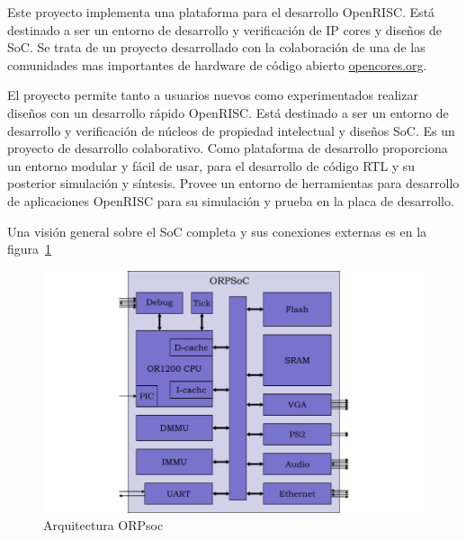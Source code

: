 				Este proyecto implementa una plataforma para el desarrollo OpenRISC. Está destinado a ser un entorno de desarrollo y verificación de IP cores y
				diseños de SoC. Se trata de un proyecto desarrollado con la colaboración de una de las comunidades mas importantes de hardware de código abierto
				\url{opencores.org}.


El proyecto permite tanto a usuarios nuevos como experimentados realizar diseños con un desarrollo rápido OpenRISC. Está destinado a ser un entorno de desarrollo y verificación de núcleos de propiedad intelectual y diseños SoC. Es un proyecto de desarrollo colaborativo. Como plataforma de desarrollo proporciona un entorno modular y fácil de usar, para el desarrollo de código RTL y su posterior simulación y síntesis. Provee un entorno de herramientas para desarrollo de aplicaciones OpenRISC para su simulación y prueba en la placa de desarrollo.

Una visión general sobre el SoC completa y sus conexiones externas es en la  figura~\ref{fig:esquemaorpsoc}

\begin{figure}[h!]
 \begin{center}
  \includegraphics[width=1\textwidth,keepaspectratio=true]{./images/orpsoc}
  \caption{Arquitectura ORPsoc}
  \label{fig:esquemaorpsoc}
 \end{center}
\end{figure}

